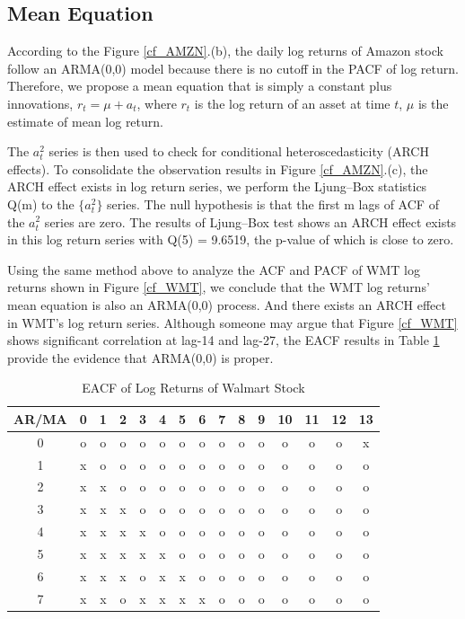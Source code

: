 \documentclass[paper=a4, fontsize=11pt]{article}
\begin{document}
\subsection{Mean Equation}
According to the Figure \ref{cf_AMZN}.(b), the daily log returns of Amazon stock follow an ARMA(0,0) model because there is no cutoff in the PACF of log return. Therefore, we propose a mean equation that is simply a constant plus innovations, $r_t = \mu + a_t$, where $r_t$  is the log return of an asset at time $t$, $\mu$ is the estimate of mean log return. 

The $a_t^2$ series is then used to check for conditional heteroscedasticity (ARCH effects). To consolidate the observation results in Figure \ref{cf_AMZN}.(c), the ARCH effect exists in log return series, we perform the Ljung–Box statistics Q(m) to the $\{a_t^2\}$ series. The null hypothesis is that the first m lags of ACF of the $a_t^2$ series are zero. The results of Ljung–Box test shows an ARCH effect exists in this log return series with Q(5) = 9.6519, the p-value of which is close to zero.

Using the same method above to analyze the ACF and PACF of WMT log returns shown in Figure \ref{cf_WMT}, we conclude that the WMT log returns' mean equation is also an ARMA(0,0) process. And there exists an ARCH effect in WMT's log return series. Although someone may argue that Figure \ref{cf_WMT} shows significant correlation at lag-14 and lag-27, the EACF results in Table \ref{eacf_WMT} provide the evidence that ARMA(0,0) is proper. 

\begin{table}[!htbp] \centering 
  \caption{EACF of Log Returns of Walmart Stock} 
  \label{eacf_WMT} 
\begin{tabular}{c|cccccccccccccc} 
\hline 
\hline
AR/MA & 0 &1 & 2 & 3 & 4 & 5 & 6 & 7 & 8 & 9 & 10 & 11 & 12 & 13\\
\hline 
0 & o & o & o & o & o & o & o & o & o & o & o & o & o & x \\ 
1 & x & o & o & o & o & o & o & o & o & o & o & o & o & o \\ 
2 & x & x & o & o & o & o & o & o & o & o & o & o & o & o \\ 
3 & x & x & x & o & o & o & o & o & o & o & o & o & o & o \\ 
4 & x & x & x & x & o & o & o & o & o & o & o & o & o & o \\ 
5 & x & x & x & x & x & o & o & o & o & o & o & o & o & o \\ 
6 & x & x & x & o & x & x & o & o & o & o & o & o & o & o \\ 
7 & x & x & o & x & x & x & x & o & o & o & o & o & o & o \\ 
\hline
\end{tabular} 
\end{table} 
\end{document}
